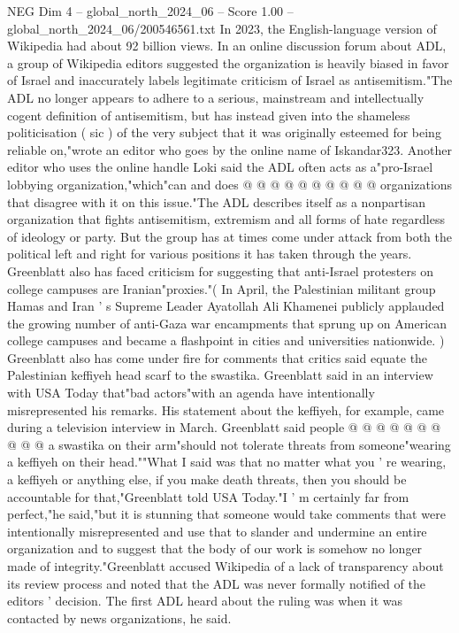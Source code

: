 \begin{textsample}{NEG Dim 4 – global\_north\_2024\_06 – Score 1.00 – global\_north\_2024\_06/200546561.txt}
In 2023, the English-language version of Wikipedia had about 92 billion views.
In an online discussion forum about ADL, a group of Wikipedia editors suggested the organization is heavily biased in favor of Israel and inaccurately labels legitimate criticism of Israel as antisemitism."The ADL no longer appears to adhere to a serious, mainstream and intellectually cogent definition of antisemitism, but has instead given into the shameless politicisation ( sic ) of the very subject that it was originally esteemed for being reliable on,"wrote an editor who goes by the online name of Iskandar323.
Another editor who uses the online handle Loki said the ADL often acts as a"pro-Israel lobbying organization,"which"can and does @ @ @ @ @ @ @ @ @ @ organizations that disagree with it on this issue."The ADL describes itself as a nonpartisan organization that fights antisemitism, extremism and all forms of hate regardless of ideology or party.
But the group has at times come under attack from both the political left and right for various positions it has taken through the years.
Greenblatt also has faced criticism for suggesting that anti-Israel protesters on college campuses are Iranian"proxies."( In April, the Palestinian militant group Hamas and Iran ' s Supreme Leader Ayatollah Ali Khamenei publicly applauded the growing number of anti-Gaza war encampments that sprung up on American college campuses and became a flashpoint in cities and universities nationwide. ) Greenblatt also has come under fire for comments that critics said equate the Palestinian keffiyeh head scarf to the swastika.
Greenblatt said in an interview with USA Today that"bad actors"with an agenda have intentionally misrepresented his remarks.
His statement about the keffiyeh, for example, came during a television interview in March.
Greenblatt said people @ @ @ @ @ @ @ @ @ @ a swastika on their arm"should not tolerate threats from someone"wearing a keffiyeh on their head.""What I said was that no matter what you ' re wearing, a keffiyeh or anything else, if you make death threats, then you should be accountable for that,"Greenblatt told USA Today."I ' m certainly far from perfect,"he said,"but it is stunning that someone would take comments that were intentionally misrepresented and use that to slander and undermine an entire organization and to suggest that the body of our work is somehow no longer made of integrity."Greenblatt accused Wikipedia of a lack of transparency about its review process and noted that the ADL was never formally notified of the editors ' decision.
The first ADL heard about the ruling was when it was contacted by news organizations, he said.

\end{textsample}
